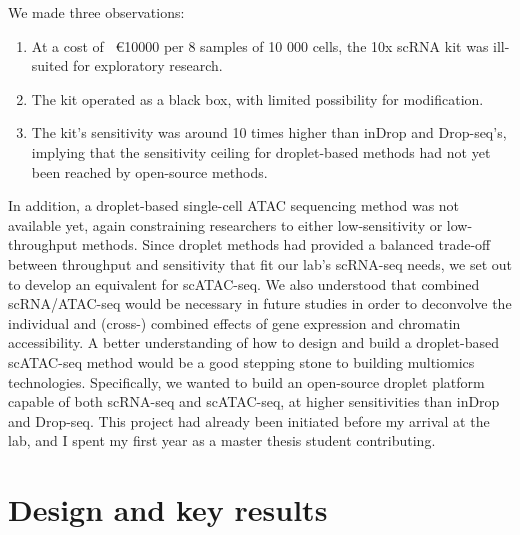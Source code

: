 We made three observations:
\begin{enumerate}[noitemsep]
	\item At a cost of ~\euro{\num{10000}} per 8 samples of 10 000 cells, the 10x scRNA kit was ill-suited for exploratory research.
	\item The kit operated as a black box, with limited possibility for modification.
	\item The kit's sensitivity was around 10 times higher than inDrop and Drop-seq's, implying that the sensitivity ceiling for droplet-based methods had not yet been reached by open-source methods.
\end{enumerate}

In addition, a droplet-based single-cell ATAC sequencing method was not available yet, again constraining researchers to either low-sensitivity or low-throughput methods. Since droplet methods had provided a balanced trade-off between throughput and sensitivity that fit our lab's scRNA-seq needs, we set out to develop an equivalent for scATAC-seq. We also understood that combined scRNA/ATAC-seq would be necessary in future studies in order to deconvolve the individual and (cross-) combined effects of gene expression and chromatin accessibility. A better understanding of how to design and build a droplet-based scATAC-seq method would be a good stepping stone to building multiomics technologies. Specifically, we wanted to build an open-source droplet platform capable of both scRNA-seq and scATAC-seq, at higher sensitivities than inDrop and Drop-seq. This project had already been initiated before my arrival at the lab, and I spent my first year as a master thesis student contributing.

\section{Design and key results}

